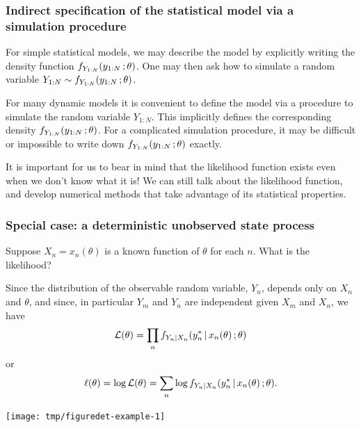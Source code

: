 \documentclass{beamer}\usepackage[]{graphicx}\usepackage[]{color}
\newenvironment{knitrout}{}{} %
\begin{document}
\begin{frame}[fragile]

\frametitle{Indirect specification of the statistical model via a simulation procedure}

\bi

\item  For simple statistical models, we may describe the model by explicitly writing the density function $f_{Y_{1:N}}(y_{1:N}\,;\theta)$. 
One may then ask how to simulate a random variable $Y_{1:N}\sim f_{Y_{1:N}}(y_{1:N}\,;\theta)$.

\item  For many dynamic models it is convenient to define the model via a procedure to simulate the random variable $Y_{1:N}$. 
This implicitly defines the corresponding density $f_{Y_{1:N}}(y_{1:N}\,;\theta)$. 
For a complicated simulation procedure, it may be difficult or impossible to write down $f_{Y_{1:N}}(y_{1:N}\,;\theta)$ exactly. 

\item  It is important for us to bear in mind that the likelihood function exists even when we don't know what it is! We can still talk about the likelihood function, and develop numerical methods that take advantage of its statistical properties.

\ei

\end{frame}   

\begin{frame}[fragile]

\frametitle{Special case: a deterministic unobserved state process}

\bi

\item  Suppose $X_{n}=x_n(\theta)$ is a known function of $\theta$ for each $n$.
What is the likelihood?

\item  Since the distribution of the observable random variable, $Y_n$, depends only on $X_n$ and $\theta$, and since, in particular $Y_{m}$ and $Y_{n}$ are independent given $X_{m}$ and $X_{n}$, we have 
$$\mathcal{L}(\theta) = \prod_{n} f_{Y_n|X_n}(y_n^*{\, | \,} x_n(\theta)\,; \theta)$$ 
or 
$$\ell(\theta) = \log\mathcal{L}(\theta) = \sum_{n} \log f_{Y_n|X_n}(y_n^*{\, | \,} x_n(\theta)\,; \theta).$$
\ei

\begin{knitrout}\small
{}\color{fgcolor}

{\centering \texttt{[image: tmp/figuredet-example-1]} 

}



\end{knitrout}

\end{frame} 
\end{document}
